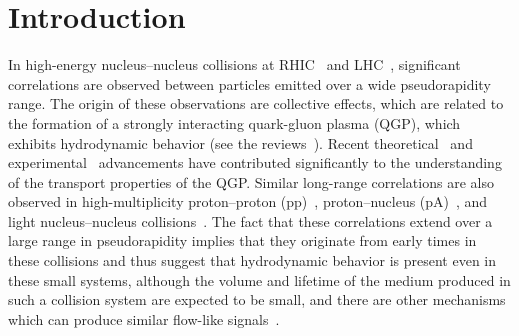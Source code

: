 
\section{Introduction}
\label{sec:intro}

In high-energy nucleus--nucleus collisions at RHIC~\cite{Adams:2005dq,Adcox:2004mh,Arsene:2004fa,Back:2004je} and LHC~\cite{Abelev:2012di, Abelev:2014pua, ATLAS:2011ah}, significant correlations are observed between particles emitted over a wide pseudorapidity range. The origin of these observations are collective effects, which are related to the formation of a strongly interacting quark-gluon plasma (QGP), which exhibits hydrodynamic behavior (see the reviews~\cite{Romatschke:2007mq,Jeon:2015dfa,Romatschke:2017ejr}). 
Recent theoretical~\cite{Niemi:2015qia,Bernhard:2016tnd,Bernhard:2019bmu} and experimental~\cite{ALICE:2016kpq,Acharya:2017gsw,Acharya:2017zfg,Acharya:2020taj} advancements have contributed significantly to the understanding of the transport properties of the QGP.
Similar long-range correlations are also observed in high-multiplicity proton--proton (pp)~\cite{Aad:2015gqa,Khachatryan:2015lva,Khachatryan:2016txc,Acharya:2019vdf}, proton--nucleus (pA)~\cite{Abelev:2012ola,Aad:2014lta,Aaboud:2016yar,Khachatryan:2016ibd}, and light nucleus--nucleus collisions~\cite{PHENIX:2018lia,Aidala:2017ajz}. The fact that these correlations extend over a large range in pseudorapidity implies that they originate from early times in these collisions and thus suggest that hydrodynamic behavior is present even in these small systems, although the volume and lifetime of the medium produced in such a collision system are expected to be small, and there are other mechanisms which can produce similar flow-like signals~\cite{Busza:2018rrf,Nagle:2018nvi}.

